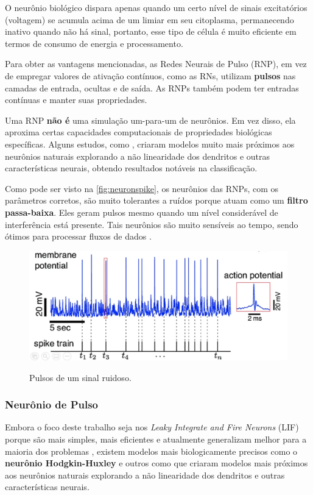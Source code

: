 			\par O neurônio biológico dispara apenas quando um certo nível de sinais excitatórios (voltagem) se acumula acima de um limiar em seu citoplasma, permanecendo inativo quando não há sinal, portanto, esse tipo de célula é muito eficiente em termos de consumo de energia e processamento.
			
			\par Para obter as vantagens mencionadas, as Redes Neurais de Pulso (RNP), em vez de empregar valores de ativação contínuos, como as RNs, utilizam \textbf{pulsos} nas camadas de entrada, ocultas e de saída. As RNPs também podem ter entradas contínuas e manter suas propriedades.
			
			\par Uma RNP \textbf{não é} uma simulação um-para-um de neurônios. Em vez disso, ela aproxima certas capacidades computacionais de propriedades biológicas específicas. Alguns estudos, como \cite{jones2020single}, criaram modelos muito mais próximos aos neurônios naturais explorando a não linearidade dos dendritos e outras características neurais, obtendo resultados notáveis na classificação.
			
			\par Como pode ser visto na  \autoref{fig:neuronspike}, os neurônios das RNPs, com os parâmetros corretos, são muito tolerantes a ruídos porque atuam como um \textbf{filtro passa-baixa}. Eles geram pulsos mesmo quando um nível considerável de interferência está presente. Tais neurônios são muito sensíveis ao tempo, sendo ótimos para processar fluxos de dados \cite{10242251}.
			
			\begin{figure}[H]
				\centering
				\caption{Pulsos de um sinal ruidoso.}
				\includegraphics[width=0.7\linewidth]{images/neuronSpikes}
				\label{fig:neuronspike}
			\end{figure}
				
			\subsubsection{Neurônio de Pulso}
				\par Embora o foco deste trabalho seja nos \textit{Leaky Integrate and Fire Neurons} (LIF) porque são mais simples, mais eficientes e atualmente generalizam melhor para a maioria dos problemas \cite{dan_goodman_2022_7044500}, existem modelos mais biologicamente precisos como o \textbf{neurônio Hodgkin-Huxley} \cite{gerstner2014neuronal} e outros como \cite{jones2020single} que criaram modelos mais próximos aos neurônios naturais explorando a não linearidade dos dendritos e outras características neurais.
		
